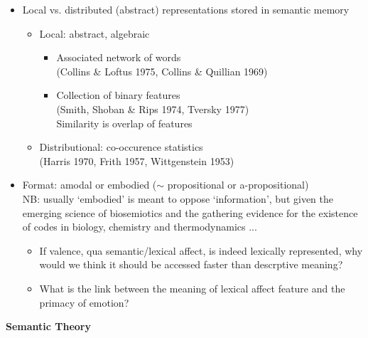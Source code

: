 \documentclass[12pt,letterpaper,table,svgnames,dvipsnames]{article}
\begin{document}
\begin{itemize}

    \item Local vs. distributed (abstract) representations stored in semantic memory

        \begin{itemize}
            \item Local: abstract, algebraic
                \begin{itemize}
                    \item Associated network of words \\
                    (Collins \& Loftus 1975, Collins \& Quillian 1969)

                    
                    \item Collection of binary features\\
                    (Smith, Shoban \& Rips 1974, Tversky 1977)\\
                    Similarity is overlap of features
                \end{itemize}

            \item Distributional: co-occurence statistics\\
            (Harris 1970, Frith 1957, Wittgenstein 1953)
            
        \end{itemize}

    \item Format: amodal or embodied ($\sim$ propositional or a-propositional)\\
    NB: usually `embodied' is meant to oppose `information', but given the emerging science of biosemiotics and the gathering evidence for the existence of codes in biology, chemistry and thermodynamics ... 
        \begin{itemize}

            \item If valence, qua semantic/lexical affect, is indeed lexically represented, why would we think it should be accessed faster than descrptive meaning?

            \item What is the link between the meaning of lexical affect feature and the primacy of emotion?

        \end{itemize}
\end{itemize}


\noindent \textbf{Semantic Theory}
\end{document}
